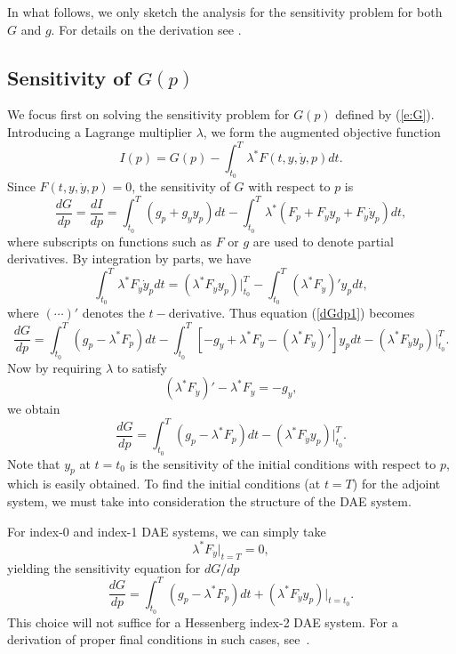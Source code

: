 In what follows, we only sketch the analysis for the sensitivity problem for both $G$ and $g$.
For details on the derivation see \cite{CLPS:03}.

\subsection{Sensitivity of $G(p)$}

We focus first on solving the sensitivity problem for $G(p)$ defined by
(\ref{e:G}).
Introducing a Lagrange multiplier $\lambda$, we form the augmented objective function
$$
I(p) = G(p) - \int_{t_0}^T \lambda^*F(t, y,\dot y, p) dt.
$$
Since $F(t, y,\dot y, p)=0$, the sensitivity of $G$ with respect to $p$ is
\begin{equation}\label{dGdp1}
\frac{dG}{dp} = \frac{dI}{dp}
=\int_{t_0}^T(g_p + g_yy_p)dt - \int_{t_0}^T \lambda^*( F_p + F_yy_p +
F_{\dot{y}}\dot{y}_p)dt,
\end{equation}
where subscripts on functions such as $F$ or $g$ are used to denote partial derivatives.
By integration by parts, we have
$$
  \int_{t_0}^T \lambda^* F_{\dot{y}} \dot{y}_p dt =
  (\lambda^* F_{\dot{y}}y_p) |_{t_0}^{T}
  - \int_{t_0}^T (\lambda^* F_{\dot{y}})' y_p dt ,
$$
where $(\cdots)'$ denotes the $t-$derivative.
Thus equation (\ref{dGdp1}) becomes
\begin{equation}
\frac{dG}{dp} = \int_{t_0}^T \left(g_p - \lambda^*F_p \right) dt -
    \int_{t_0}^T \left[-g_y + \lambda^*F_y - (\lambda^*F_{\dot y})'\right]y_p dt
     - (\lambda^* F_{\dot{y}} y_p) |_{t_0}^{T}.
\end{equation}
Now by requiring $\lambda$ to satisfy
\begin{equation}\label{e:adj_eqns}
(\lambda^*F_{\dot{y}})' - \lambda^*F_y = -g_y ,
\end{equation}
we obtain
\begin{equation}\label{e:dGdp}
\frac{dG}{dp} = \int_{t_0}^T \left(
  g_p - \lambda^*F_p \right) dt
- (\lambda^* F_{\dot{y}}y_p)|_{t_0}^T .
\end{equation}
Note that $y_p$ at $t=t_0$ is the sensitivity of the initial conditions
with respect to $p$, which is easily obtained.  To find the initial conditions
(at $t = T$) for the adjoint system, we must take into consideration
the structure of the DAE system.

For index-0 and index-1 DAE systems, we can simply take
\begin{equation}
\lambda^*F_{\dot y}|_{t=T} = 0,
\label{ad-init1}
\end{equation}
yielding the sensitivity equation for ${dG}/{dp}$
\begin{equation}
\frac{dG}{dp} = \int_{t_0}^T \left(
  g_p - \lambda^*F_p \right) dt
+ (\lambda^* F_{\dot{y}}y_p)|_{t=t_0} .
\label{sensi12}
\end{equation}
This choice will not suffice for a Hessenberg index-2 DAE system. For a derivation
of proper final conditions in such cases, see~\cite{CLPS:03}.

